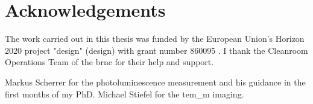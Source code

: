 \chapter{Acknowledgements}

The work carried out in this thesis was funded by the European Union's Horizon 2020 project "\acl{design}" (\acs{design}) with grant number 860095 \cite{CordisDESIGN}. I thank the Cleanroom Operations Team of the \acl{brnc} for their help and support. 

Markus Scherrer for the photoluminescence measurement and his guidance in the first months of my PhD. 
Michael Stiefel for the \acs{tem_m} imaging.